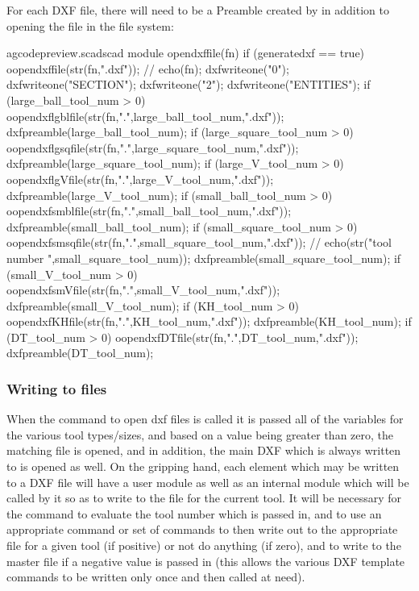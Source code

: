\documentclass{ltxdoc}
\begin{document}
For each DXF file, there will need to be a Preamble created by  in addition to opening the file in the file system:

\lstset{firstnumber=\thegcpscad}
\begin{writecode}{a}{gcodepreview.scad}{scad}
module opendxffile(fn) {
  if (generatedxf == true) {
      oopendxffile(str(fn,".dxf"));
//    echo(fn);
      dxfwriteone("0");
      dxfwriteone("SECTION");
      dxfwriteone("2");
      dxfwriteone("ENTITIES");
    if (large_ball_tool_num >  0) {    oopendxflgblfile(str(fn,".",large_ball_tool_num,".dxf"));
      dxfpreamble(large_ball_tool_num);
    } 
    if (large_square_tool_num >  0) {    oopendxflgsqfile(str(fn,".",large_square_tool_num,".dxf"));
      dxfpreamble(large_square_tool_num);
    } 
    if (large_V_tool_num >  0) {    oopendxflgVfile(str(fn,".",large_V_tool_num,".dxf"));
      dxfpreamble(large_V_tool_num);
    } 
    if (small_ball_tool_num >  0) { oopendxfsmblfile(str(fn,".",small_ball_tool_num,".dxf"));
      dxfpreamble(small_ball_tool_num);
    } 
    if (small_square_tool_num >  0) {    oopendxfsmsqfile(str(fn,".",small_square_tool_num,".dxf"));
//    echo(str("tool number ",small_square_tool_num));
      dxfpreamble(small_square_tool_num);
    } 
    if (small_V_tool_num >  0) {    oopendxfsmVfile(str(fn,".",small_V_tool_num,".dxf"));
      dxfpreamble(small_V_tool_num);
    } 
    if (KH_tool_num >  0) {    oopendxfKHfile(str(fn,".",KH_tool_num,".dxf"));
      dxfpreamble(KH_tool_num);
    } 
    if (DT_tool_num >  0) {    oopendxfDTfile(str(fn,".",DT_tool_num,".dxf"));
      dxfpreamble(DT_tool_num);
    } 
  }
}

\end{writecode}
\addtocounter{gcpscad}{36}

\subsubsection{Writing to files}
 
When the command to open dxf files is called it is passed all of the variables for the various tool types/sizes, and based on a value being greater than zero, the matching file is opened, and in addition, the main DXF which is always written to is opened as well. On the gripping hand, each element which may be written to a DXF file will have a user module as well as an internal module which will be called by it so as to write to the file for the current tool. It will be necessary for the  command to evaluate the tool number which is passed in, and to use an appropriate command or set of commands to then write out to the appropriate file for a given tool (if positive) or not do anything (if zero), and to write to the master file if a negative value is passed in (this allows the various DXF template commands to be written only once and then called at need).
\end{document}
